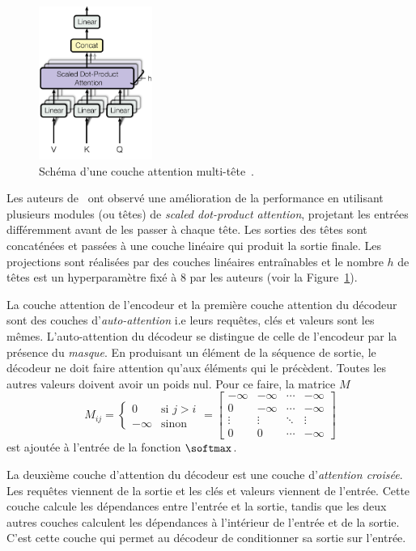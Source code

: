 \begin{figure}[hbt]
    \centering
    \includegraphics[height=5cm]{assets/images/multihead-attention.png}
    \caption[Schéma d'une couche attention multitête.]
    {Schéma d'une couche attention multi-tête~\cite{attention}.}
    \label{fig.multihead-attention}
\end{figure}

Les auteurs de~\cite{attention} ont observé une amélioration de la performance 
en utilisant plusieurs modules (ou têtes) de \emph{\foreignlanguage{english}{scaled dot-product attention}},
projetant les entrées différemment avant de les passer à chaque tête.
Les sorties des têtes sont concaténées et passées à une couche linéaire qui produit la sortie finale.
Les projections sont réalisées par des couches linéaires entraînables et le nombre \(h\) de têtes est un hyperparamètre fixé à \(8\) par les auteurs (voir la Figure~\ref{fig.multihead-attention}).

La couche attention de l'encodeur et la première couche attention du décodeur sont des couches
d'\emph{auto-attention} i.e leurs requêtes, clés et valeurs sont les mêmes.
L'auto-attention du décodeur se distingue de celle de l'encodeur par la présence du \emph{masque}.
En produisant un élément de la séquence de sortie, le décodeur ne doit faire attention qu'aux éléments
qui le précèdent.
Toutes les autres valeurs doivent avoir un poids nul.
Pour ce faire, la matrice \(M\) 
\begin{equation}
    M_{ij} = \begin{cases}
        0 & \text{si } j > i \\
        -\infty & \text{sinon}
    \end{cases} 
    = \begin{bmatrix}
        -\infty & -\infty & \cdots & -\infty \\
        0       & -\infty & \cdots & -\infty \\
        \vdots  & \vdots  & \ddots & \vdots \\
        0       & 0       & \cdots & -\infty
    \end{bmatrix}
\end{equation}
est ajoutée à l'entrée de la fonction \(\softmax\).

La deuxième couche d'attention du décodeur est une couche d'\emph{attention croisée}.
Les requêtes viennent de la sortie et les clés et valeurs viennent de l'entrée.
Cette couche calcule les dépendances entre l'entrée et la sortie,
tandis que les deux autres couches calculent les dépendances à l'intérieur de l'entrée et de la sortie.
C'est cette couche qui permet au décodeur de conditionner sa sortie sur l'entrée.


